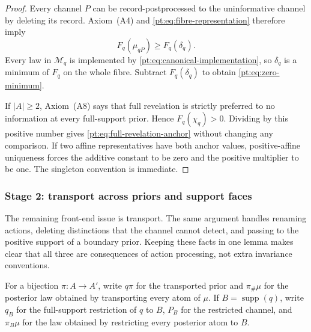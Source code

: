 \begin{proof}
Every channel $P$ can be record-postprocessed to the uninformative channel by
deleting its record.  Axiom~\textup{(A4)} and
\eqref{pt:eq:fibre-representation} therefore imply
\[
 F_q(\mu_{qP})\ge F_q(\delta_q).
\]
Every law in $\mathcal M_q$ is implemented by
\eqref{pt:eq:canonical-implementation}, so $\delta_q$ is a minimum of $F_q$
on the whole fibre.  Subtract $F_q(\delta_q)$ to obtain
\eqref{pt:eq:zero-minimum}.

If $|A|\ge2$, Axiom~\textup{(A8)} says that full revelation is strictly
preferred to no information at every full-support prior.  Hence
$F_q(\chi_q)>0$.  Dividing by this positive number gives
\eqref{pt:eq:full-revelation-anchor} without changing any comparison.  If two
affine representatives have both anchor values, positive-affine uniqueness
forces the additive constant to be zero and the positive multiplier to be
one.  The singleton convention is immediate.
\end{proof}

\subsubsection{Stage 2: transport across priors and support faces}

The remaining front-end issue is transport.  The same argument handles
renaming actions, deleting distinctions that the channel cannot detect, and
passing to the positive support of a boundary prior.  Keeping these facts in
one lemma makes clear that all three are consequences of action processing,
not extra invariance conventions.

For a bijection $\pi:A\to A'$, write $q\pi$ for the transported prior and
$\pi_\#\mu$ for the posterior law obtained by transporting every atom of
$\mu$.  If $B=\operatorname{supp}(q)$, write $q_B$ for the full-support
restriction of $q$ to $B$, $P_B$ for the restricted channel, and
$\pi_B\mu$ for the law obtained by restricting every posterior atom to $B$.

